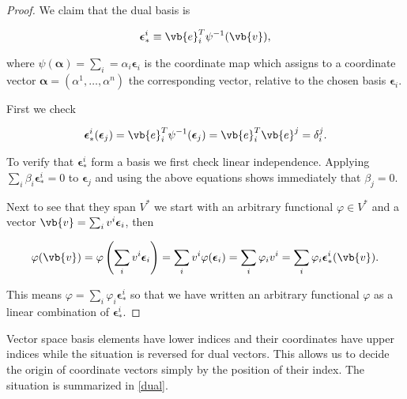 \documentclass[a4paper,12pt]{report}
\begin{document}
\begin{proof}
    We claim that the dual basis is
    
    \begin{equation}
        \boldsymbol{\epsilon }_{*}^{i} \equiv \vb{e} _{i}^T \psi ^{-1} (\vb{v} ),
    \end{equation}

    where \(\psi (\boldsymbol{\alpha } ) = \sum_{i}^{} = \alpha _{i}\boldsymbol{\epsilon }_{i}    \) is the coordinate map which assigns to a coordinate vector \(\boldsymbol{\alpha } = (\alpha ^{1}, \ldots ,\alpha ^{n}  ) \) the corresponding vector, relative to the chosen basis \(\boldsymbol{\epsilon }_{i}  \).   

    First we check 

    \begin{equation}
        \boldsymbol{\epsilon }^{i}_{*} (\boldsymbol{\epsilon }_{j}  ) = \vb{e} _{i}^T \psi ^{-1} (\boldsymbol{\epsilon }_{j}  ) = \vb{e} _{i}^T \vb{e} ^{j} = \delta _{i}^{j}.        
    \end{equation}

    To verify that \(\boldsymbol{\epsilon }_{*}^{i}  \) form a basis we first check linear independence. Applying \(\sum_{i}^{} \beta _{i}\boldsymbol{\epsilon }_{*}^{i} = 0 \) to \(\boldsymbol{\epsilon }_{j}  \) and using the above equations shows immediately that \(\beta _{j}= 0 \). 
    
    Next to see that they span \(V^*\) we start with an arbitrary functional \(\varphi \in V^*\) and a vector \(\vb{v} = \sum_{i}^{}v^{i}\boldsymbol{\epsilon }_{i}    \), then 

    \begin{equation}
        \varphi (\vb{v} ) = \varphi \left( \sum_{i}^{}v^{i}\boldsymbol{\epsilon }_{i}     \right)= \sum_{i}^{}v^{i} \varphi (\boldsymbol{\epsilon }_{i}  ) = \sum_{i}^{} \varphi _{i}v^{i} = \sum_{i}^{}\varphi _{i}\boldsymbol{\epsilon }_{*}^{i}(\vb{v} ).          
    \end{equation}

    This means \(\varphi = \sum_{i}^{} \varphi _{i}\boldsymbol{\epsilon }_{*}^{i}    \) so that we have written an arbitrary functional \(\varphi \) as a linear combination of \(\boldsymbol{\epsilon }_{*}^{i}   \).
\end{proof}

Vector space basis elements have lower indices and their coordinates have upper indices while the situation is reversed for dual vectors. This allows us to decide the origin of coordinate vectors simply by the position of their index. The situation is summarized in \cref{dual}. 
\end{document}
